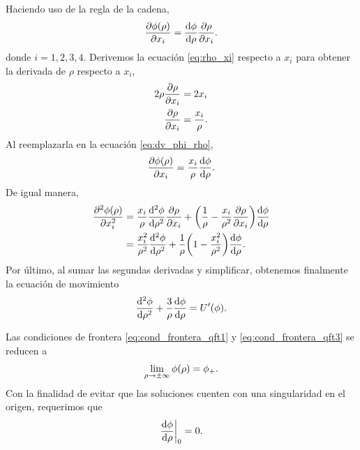 Haciendo uso de la regla de la cadena, 
\begin{equation} \label{eq:dv_phi_rho}
	\pdv{\phi\qty(\rho)}{x_i} = \dv{\phi}{\rho}\pdv{\rho}{x_i}.
\end{equation}
donde $i = 1, 2, 3, 4$. 
Derivemos la ecuación \eqref{eq:rho_xi} respecto a $x_i$ para obtener la derivada de $\rho$ respecto a $x_i$, 
\begin{align}
2\rho \pdv{\rho}{x_i} &= 2x_i \\ \label{eq:dv_rho_xi}
\pdv{\rho}{x_i} &= \frac{x_i}{\rho}.
\end{align}
Al reemplazarla 
en la ecuación \eqref{eq:dv_phi_rho}, 
\begin{equation} \label{eq:dv_phi_rho2}
\pdv{\phi\qty(\rho)}{x_i} = \frac{x_i}{\rho}\dv{\phi}{\rho}.
\end{equation}
De igual manera, %
\begin{align}
	\pdv[2]{\phi\qty(\rho)}{x_i} &= \frac{x_i}{\rho}\dv[2]{\phi}{\rho}\pdv{\rho}{x_i} + \qty(\frac{1}{\rho} - \frac{x_i}{\rho^2}\pdv{\rho}{x_i})\dv{\phi}{\rho} \\
	&= \frac{x_i^2}{\rho^2}\dv[2]{\phi}{\rho} + \frac{1}{\rho}\qty(1 - \frac{x_i^2}{\rho^2})\dv{\phi}{\rho}. 
\end{align}
Por último, al sumar las segundas derivadas
y simplificar, obtenemos finalmente la ecuación de movimiento 
\begin{equation} \label{eq:eom_rho}
	\dv[2]{\phi}{\rho} + \frac{3}{\rho}\dv{\phi}{\rho} = U'\qty(\phi).
\end{equation}

Las condiciones de frontera \eqref{eq:cond_frontera_qft1} y \eqref{eq:cond_frontera_qft3} se reducen a 
\begin{equation} \label{eq:cond_frontera_rho1}
\lim_{\rho \rightarrow \pm\infty} \phi\qty(\rho) = \phi_+.
\end{equation}
Con la finalidad de evitar que las soluciones cuenten con una singularidad en el origen, requerimos que \cite{coleman1977fate}
\begin{equation} \label{eq:cond_frontera_rho2}
	\eval{\dv{\phi}{\rho}}_0 = 0.
\end{equation}

